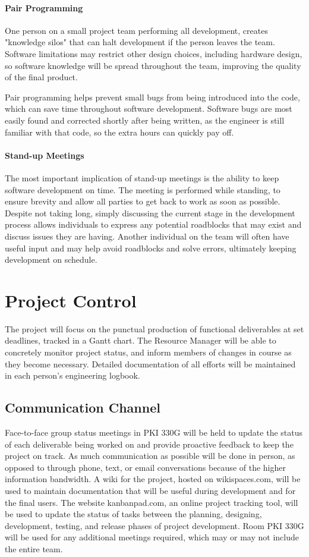 \paragraph{Pair Programming}
One person on a small project team performing all development, creates "knowledge silos" that can halt development if the person leaves the team.
Software limitations may restrict other design choices, including hardware design, so software knowledge will be spread throughout the team, improving the quality of the final product. 

Pair programming helps prevent small bugs from being introduced into the code, which can save time throughout software development.
Software bugs are most easily found and corrected shortly after being written, as the engineer is still familiar with that code, so the extra hours can quickly pay off.

\paragraph{Stand-up Meetings}
The most important implication of stand-up meetings is the ability to keep software development on time.
The meeting is performed while standing, to ensure brevity and allow all parties to get back to work as soon as possible.
Despite not taking long, simply discussing the current stage in the development process allows individuals to express any potential roadblocks that may exist and discuss issues they are having.
Another individual on the team will often have useful input and may help avoid roadblocks and solve errors, ultimately keeping development on schedule. 

\section{Project Control}
The project will focus on the punctual production of functional deliverables at set deadlines, tracked in a Gantt chart.
The Resource Manager will be able to concretely monitor project status, and inform members of changes in course as they become necessary.
Detailed documentation of all efforts will be maintained in each person's engineering logbook.

\subsection{Communication Channel}
Face-to-face group status meetings in PKI 330G will be held to update the status of each deliverable being worked on and provide proactive feedback to keep the project on track.
As much communication as possible will be done in person, as opposed to through phone, text, or email conversations because of the higher information bandwidth.
A wiki for the project, hosted on wikispaces.com, will be used to maintain documentation that will be useful during development and for the final users. 
The website kanbanpad.com, an online project tracking tool, will be used to update the status of tasks between the planning, designing, development, testing, and release phases of project development.
Room PKI 330G will be used for any additional meetings required, which may or may not include the entire team.

